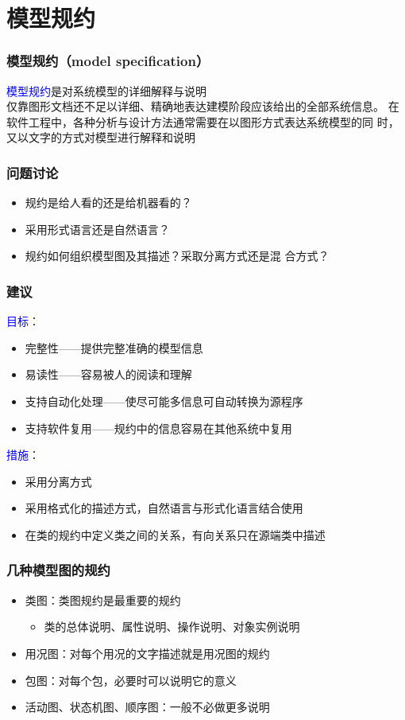 \documentclass[compress]{beamer}
\begin{document}
\section{模型规约}

\begin{frame}
  \frametitle{模型规约（model specification）}
  \textcolor{blue}{模型规约}是对系统模型的详细解释与说明 \\

    仅靠图形文档还不足以详细、精确地表达建模阶段应该给出的全部系统信息。
    在软件工程中，各种分析与设计方法通常需要在以图形方式表达系统模型的同
    时，又以文字的方式对模型进行解释和说明
\end{frame}

\begin{frame}
  \frametitle{问题讨论}
  \begin{itemize}
    \item  规约是给\alert{人}看的还是给\alert{机器}看的？
    \item  采用\alert{形式语言}还是\alert{自然语言}？
    \item  规约如何组织模型图及其描述？采取\alert{分离方式}还是\alert{混
      合方式}？
  \end{itemize}
\end{frame}

\begin{frame}
  \frametitle{建议}
  \noindent\textcolor{blue}{目标}：
  \begin{itemize}
    \item 完整性——提供完整准确的模型信息
    \item 易读性——容易被人的阅读和理解
    \item 支持自动化处理——使尽可能多信息可自动转换为源程序
    \item 支持软件复用——规约中的信息容易在其他系统中复用
  \end{itemize}
  \textcolor{blue}{措施}：
  \begin{itemize}
    \item 采用分离方式
    \item 采用格式化的描述方式，自然语言与形式化语言结合使用
    \item 在类的规约中定义类之间的关系，有向关系只在源端类中描述
  \end{itemize}
\end{frame}

\begin{frame}
  \frametitle{几种模型图的规约}
  \begin{itemize}
    \item 类图：类图规约是最重要的规约
      \begin{itemize}
        \item 类的总体说明、属性说明、操作说明、对象实例说明
      \end{itemize}
    \item 用况图：对每个用况的文字描述就是用况图的规约
    \item 包图：对每个包，必要时可以说明它的意义 
    \item 活动图、状态机图、顺序图：一般不必做更多说明
  \end{itemize}
\end{frame}
\end{document}
